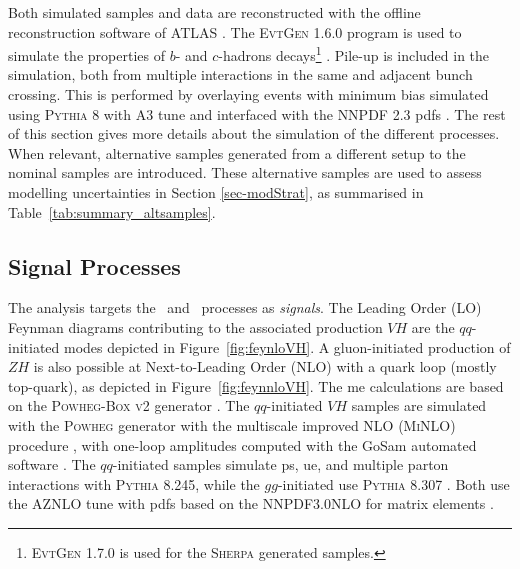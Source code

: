 

Both simulated samples and data are reconstructed with the offline reconstruction software of ATLAS \cite{ATL-SOFT-PUB-2021-001}. The \textsc{EvtGen} 1.6.0 program is used to simulate the properties of $b$- and $c$-hadrons decays\footnote{\textsc{EvtGen} 1.7.0 is used for the \textsc{Sherpa} generated samples.} \cite{LANGE2001152}. Pile-up is included in the simulation, both from multiple interactions in the same and adjacent bunch crossing. This is performed by overlaying events with minimum bias simulated using \textsc{\textsc{Pythia}} 8 with A3 tune and interfaced with the \textsc{NNPDF} 2.3 \glspl{pdf} \cite{SJOSTRAND2015159}. The rest of this section gives more details about the simulation of the different processes. When relevant, alternative samples generated from a different setup to the nominal samples are introduced. These alternative samples are used to assess modelling uncertainties in Section \ref{sec-modStrat}, as summarised in Table~\ref{tab:summary_altsamples}.

\subsection{Signal Processes}
The analysis targets the \vhb\ and \vhc\ processes as \textit{signals}. The Leading Order (LO) Feynman diagrams contributing to the associated production $VH$ are the $qq$-initiated modes depicted in Figure~\ref{fig:feynloVH}. A gluon-initiated production of $ZH$ is also possible at Next-to-Leading Order (NLO) with a quark loop (mostly top-quark), as depicted in Figure~\ref{fig:feynnloVH}. The \gls{me} calculations are based on the \textsc{Powheg-Box v2} generator \cite{StefanoFrixione_20072, POWHEGBOX}. The $qq$-initiated $VH$ samples are simulated with the \textsc{Powheg} generator with the multiscale improved NLO (\textsc{MiNLO}) procedure \cite{powhegHW}, with one-loop amplitudes computed with the GoSam automated software \cite{gosam}. The $qq$-initiated samples simulate \gls{ps}, \gls{ue}, and multiple parton interactions with \textsc{Pythia} 8.245, while the $gg$-initiated use \textsc{Pythia} 8.307 \cite{SJOSTRAND2015159}. Both use the AZNLO tune \cite{measureZGboson} with \glspl{pdf} based on the \textsc{NNPDF3.0NLO} for matrix elements \cite{PDFLHCrun2}. \\

